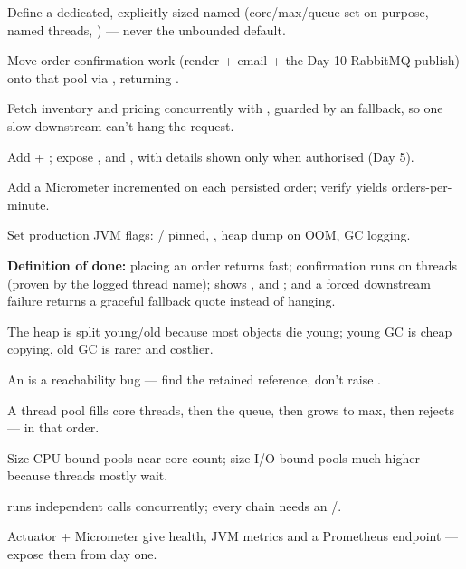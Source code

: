 \begin{buildalong}
\begin{wbitem}
  \item Define a dedicated, explicitly-sized  named  (core/max/queue set on purpose, named threads, ) --- never the unbounded default.
  \item Move order-confirmation work (render + email + the Day 10 RabbitMQ publish) onto that pool via , returning .
  \item Fetch inventory and pricing concurrently with , guarded by an  fallback, so one slow downstream can't hang the request.
  \item Add  + ; expose ,  and , with  details shown only when authorised (Day 5).
  \item Add a Micrometer   incremented on each persisted order; verify  yields orders-per-minute.
  \item Set production JVM flags: / pinned, , heap dump on OOM, GC logging.
\end{wbitem}
\smallskip\textbf{Definition of done:} placing an order returns fast; confirmation runs on  threads (proven by the logged thread name);  shows ,  and ; and a forced downstream failure returns a graceful fallback quote instead of hanging.
\end{buildalong}


\begin{tickcheck}
  \item The heap is split young/old because most objects die young; young GC is cheap copying, old GC is rarer and costlier.
  \item An  is a reachability bug --- find the retained reference, don't raise .
  \item A thread pool fills core threads, then the queue, then grows to max, then rejects --- in that order.
  \item Size CPU-bound pools near core count; size I/O-bound pools much higher because threads mostly wait.
  \item {} runs independent calls concurrently; every chain needs an /.
  \item Actuator + Micrometer give health, JVM metrics and a Prometheus endpoint --- expose them from day one.
\end{tickcheck}

